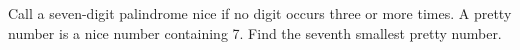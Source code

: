Call a seven-digit palindrome nice if no digit occurs three or more times. A pretty number is a nice number containing 7. Find the seventh smallest pretty number.
